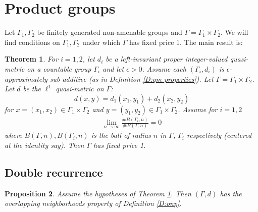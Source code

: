 \documentclass[12pt]{article}
\theoremstyle{plain}
\newtheorem{thm}{Theorem}[section]
\newtheorem{prop}[thm]{Proposition}
\theoremstyle{definition}
\newtheorem{defn}{Definition}
\theoremstyle{remark}
\newcommand{\G}{\Gamma}
\newcommand{\eps}{\epsilon}
\begin{document}
\section{Product groups}\label{S:Product-groups}

Let $\G_1,\G_2$ be finitely generated non-amenable groups and $\G=\G_1\times \G_2$. We will find conditions on $\G_1,\G_2$ under which $\G$ has fixed price 1. The main result is: %



\begin{thm}\label{T:main3}
For $i=1,2$, let $d_i$ be a left-invariant proper integer-valued quasi-metric on a countable group $\G_i$ and let $\eps>0$. Assume each $(\G_i,d_i)$ is $\eps$-approximately sub-additive (as in Definition \ref{D:qm-properties}). Let $\G=\G_1\times \G_2$. Let $d$ be the $\ell^1$ quasi-metric on $\G$:
$$d(x,y) = d_1(x_1,y_1)+d_2(x_2,y_2)$$
for $x=(x_1,x_2)\in \G_1\times \G_2$ and $y=(y_1,y_2)\in \G_1\times \G_2$. Assume for $i=1,2$
\begin{align}\label{E:balanced}
    \lim_{n\to\infty}  \frac{\#B(\G_i,n)}{\#B(\G,n)} = 0
\end{align}
where $B(\G,n),B(\G_i,n) $ is the ball of radius $n$ in $\G$, $\G_i$ respectively (centered at the identity say). Then $\G$ has fixed price 1.
\end{thm}

\subsection{Double recurrence}



\begin{prop}\label{P:balanced}
Assume the hypotheses of Theorem \ref{T:main3}. Then $(\G,d)$ has the overlapping neighborhoods property of Definition \ref{D:onp}. 
\end{prop}
\end{document}
